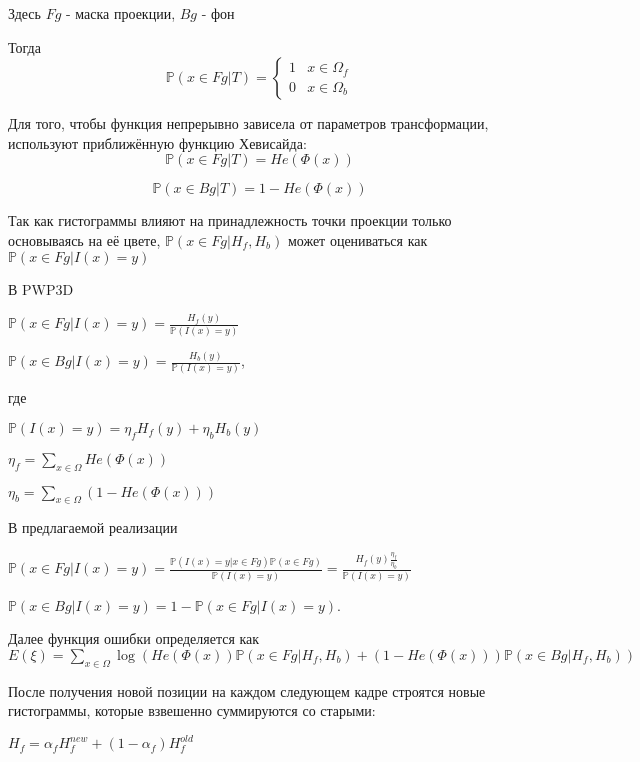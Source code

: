 
Здесь $Fg$ - маска проекции, $Bg$ - фон

Тогда
\begin{equation*}
    \mathbb{P}(x \in Fg | T) = 
     \begin{cases}
       1 &x \in \Omega_f\\
       0 &x \in \Omega_b
     \end{cases}
\end{equation*}

Для того, чтобы функция непрерывно зависела от параметров трансформации,
используют приближённую функцию Хевисайда:
$$
    \mathbb{P}(x \in Fg | T) = He(\Phi(x))
$$ 

$$
    \mathbb{P}(x \in Bg | T) = 1 - He(\Phi(x))
$$

Так как гистограммы влияют на принадлежность точки проекции только основываясь
на её цвете,
$\mathbb{P}(x \in Fg | H_f, H_b)$
может оцениваться как
$\mathbb{P}(x \in Fg | I(x) = y)$

В PWP3D

$
    \mathbb{P}(x \in Fg | I(x) = y) = \frac{H_f(y)}{\mathbb{P}(I(x) = y)}
$

$
    \mathbb{P}(x \in Bg | I(x) = y) = \frac{H_b(y)}{\mathbb{P}(I(x) = y)}
$,

где

$
    \mathbb{P}(I(x) = y) = \eta_f H_f(y) + \eta_b H_b(y)
$

$
    \eta_f = \sum\limits_{x \in \Omega}He(\Phi(x))
$

$
    \eta_b = \sum\limits_{x \in \Omega}(1 - He(\Phi(x)))
$

В предлагаемой реализации

$
    \mathbb{P}(x \in Fg | I(x) = y) = \frac{\mathbb{P}(I(x) = y | x \in Fg) \mathbb{P}(x \in Fg)}{\mathbb{P}(I(x) = y)} = \frac{H_f(y)\frac{\eta_f}{\eta_b}}{\mathbb{P}(I(x) = y)}
$

$
    \mathbb{P}(x \in Bg | I(x) = y) = 1 - \mathbb{P}(x \in Fg | I(x) = y)
$.

Далее функция ошибки определяется как
$
    E(\xi) = \sum\limits_{x \in \Omega}\log(He(\Phi(x))\mathbb{P}(x \in Fg | H_f, H_b) + (1 - He(\Phi(x)))\mathbb{P}(x \in Bg|H_f, H_b))
$

После получения новой позиции на каждом следующем кадре строятся новые
гистограммы, которые взвешенно суммируются со старыми: 

$
    H_{f} = \alpha_f H_{f}^{new} + (1 - \alpha_f) H_f^{old}
$

